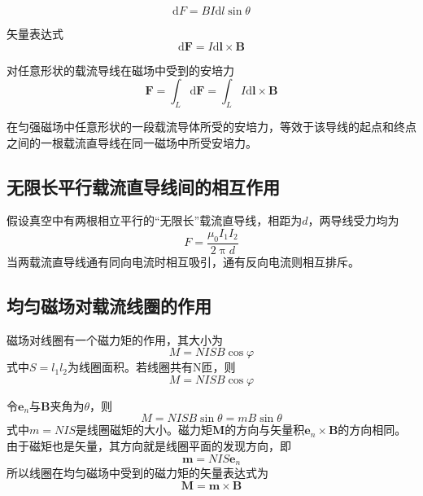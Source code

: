 \documentclass[
	12pt, %
	a4paper, %
]{myLegrandOrangeBook}
\newcommand{\rmd}{\mathrm{d}}
\begin{document}
\begin{theorem}[安培定律]
\begin{equation}
    \rmd F = B I \rmd l \sin \theta
\end{equation}
\end{theorem}

矢量表达式
\begin{equation}
    \rmd \mathbf{F} = I \rmd \mathbf{l} \times \mathbf{B}
\end{equation}

对任意形状的载流导线在磁场中受到的安培力
\begin{equation}
    \mathbf{F} = \int_L \rmd \mathbf{F} = \int_L I \rmd \mathbf{l} \times \mathbf{B}
\end{equation}

在匀强磁场中任意形状的一段载流导体所受的安培力，等效于该导线的起点和终点之间的一根载流直导线在同一磁场中所受安培力。

\subsection{无限长平行载流直导线间的相互作用}

假设真空中有两根相立平行的“无限长”载流直导线，相距为$d$，两导线受力均为
\begin{equation}
    F = \frac{\mu_0 I_1 I_2}{2 \uppi d}
\end{equation}
当两载流直导线通有同向电流时相互吸引，通有反向电流则相互排斥。

\subsection{均匀磁场对载流线圈的作用}

磁场对线圈有一个磁力矩的作用，其大小为
\begin{equation*}
    M = NISB \cos \varphi
\end{equation*}
式中\(S = l_1l_2\)为线圈面积。若线圈共有N匝，则
\begin{equation}
    M = NISB \cos \varphi
\end{equation}

令\(\boldsymbol{e}_n\)与\(\boldsymbol{B}\)夹角为\(\theta\)，则
\begin{equation}
    M = NISB \sin \theta = m B \sin \theta
\end{equation}
式中\(m = NIS\)是线圈磁矩的大小。磁力矩\(\boldsymbol{M}\)的方向与矢量积\(\boldsymbol{e}_n \times \boldsymbol{B}\)的方向相同。由于磁矩也是矢量，其方向就是线圈平面的发现方向，即
\begin{equation}
    \boldsymbol{m} = NIS \boldsymbol{e}_n
\end{equation}
所以线圈在均匀磁场中受到的磁力矩的矢量表达式为
\begin{equation}
    \boldsymbol{M} = \boldsymbol{m} \times \boldsymbol{B}
\end{equation}
\end{document}
